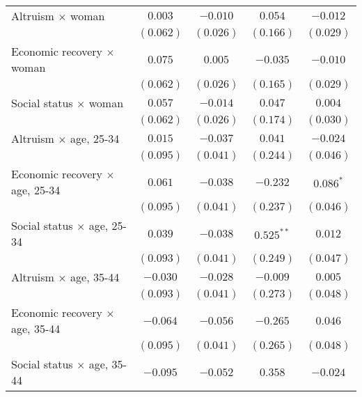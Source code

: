 \begin{table}
\begin{center}
\begin{tabular}{l c c c c}
Altruism $\times$ woman                             & $0.003$       & $-0.010$      & $0.054$       & $-0.012$       \\
                                                    & $(0.062)$     & $(0.026)$     & $(0.166)$     & $(0.029)$      \\
Economic recovery $\times$ woman                    & $0.075$       & $0.005$       & $-0.035$      & $-0.010$       \\
                                                    & $(0.062)$     & $(0.026)$     & $(0.165)$     & $(0.029)$      \\
Social status $\times$ woman                        & $0.057$       & $-0.014$      & $0.047$       & $0.004$        \\
                                                    & $(0.062)$     & $(0.026)$     & $(0.174)$     & $(0.030)$      \\
Altruism $\times$ age, 25-34                        & $0.015$       & $-0.037$      & $0.041$       & $-0.024$       \\
                                                    & $(0.095)$     & $(0.041)$     & $(0.244)$     & $(0.046)$      \\
Economic recovery $\times$ age, 25-34               & $0.061$       & $-0.038$      & $-0.232$      & $0.086^{*}$    \\
                                                    & $(0.095)$     & $(0.041)$     & $(0.237)$     & $(0.046)$      \\
Social status $\times$ age, 25-34                   & $0.039$       & $-0.038$      & $0.525^{**}$  & $0.012$        \\
                                                    & $(0.093)$     & $(0.041)$     & $(0.249)$     & $(0.047)$      \\
Altruism $\times$ age, 35-44                        & $-0.030$      & $-0.028$      & $-0.009$      & $0.005$        \\
                                                    & $(0.093)$     & $(0.041)$     & $(0.273)$     & $(0.048)$      \\
Economic recovery $\times$ age, 35-44               & $-0.064$      & $-0.056$      & $-0.265$      & $0.046$        \\
                                                    & $(0.095)$     & $(0.041)$     & $(0.265)$     & $(0.048)$      \\
Social status $\times$ age, 35-44                   & $-0.095$      & $-0.052$      & $0.358$       & $-0.024$       \\

\end{tabular}
\end{center}
\end{table}
